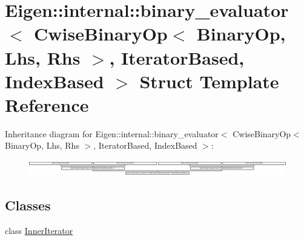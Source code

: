 \hypertarget{struct_eigen_1_1internal_1_1binary__evaluator_3_01_cwise_binary_op_3_01_binary_op_00_01_lhs_00_0cb5b32f8780f5e04222972f8f6ae2d90}{}\section{Eigen\+:\+:internal\+:\+:binary\+\_\+evaluator$<$ Cwise\+Binary\+Op$<$ Binary\+Op, Lhs, Rhs $>$, Iterator\+Based, Index\+Based $>$ Struct Template Reference}
\label{struct_eigen_1_1internal_1_1binary__evaluator_3_01_cwise_binary_op_3_01_binary_op_00_01_lhs_00_0cb5b32f8780f5e04222972f8f6ae2d90}
Inheritance diagram for Eigen\+:\+:internal\+:\+:binary\+\_\+evaluator$<$ Cwise\+Binary\+Op$<$ Binary\+Op, Lhs, Rhs $>$, Iterator\+Based, Index\+Based $>$\+:\begin{figure}[H]
\begin{center}
\leavevmode
\includegraphics[height=0.689655cm]{struct_eigen_1_1internal_1_1binary__evaluator_3_01_cwise_binary_op_3_01_binary_op_00_01_lhs_00_0cb5b32f8780f5e04222972f8f6ae2d90}
\end{center}
\end{figure}
\subsection*{Classes}
\begin{DoxyCompactItemize}
\item 
class \hyperlink{class_eigen_1_1internal_1_1binary__evaluator_3_01_cwise_binary_op_3_01_binary_op_00_01_lhs_00_012b4683c8809d5a8c88ca2030de640ed2}{Inner\+Iterator}
\end{DoxyCompactItemize}
